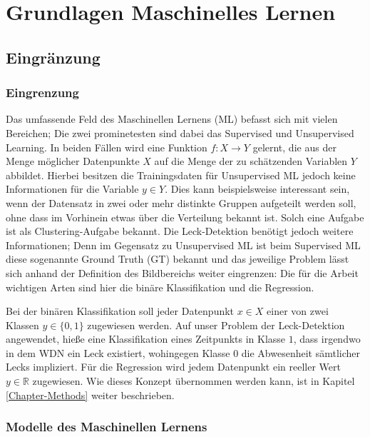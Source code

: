 \chapter{Grundlagen Maschinelles Lernen \label{Chapter-ML}}

\section{Eingränzung}

\subsection*{Eingrenzung}

Das umfassende Feld des Maschinellen Lernens (ML) befasst sich mit vielen Bereichen;
 Die zwei prominetesten sind dabei das Supervised und Unsupervised Learning. In beiden Fällen wird eine Funktion
 $f: X \rightarrow Y$ gelernt, die aus der Menge möglicher Datenpunkte $X$ auf die Menge der zu schätzenden
 Variablen $Y$ abbildet. Hierbei besitzen die Trainingsdaten für Unsupervised ML jedoch keine Informationen für
 die Variable $y \in Y$. Dies kann beispielsweise interessant sein, wenn der Datensatz in zwei oder mehr distinkte
 Gruppen aufgeteilt werden soll, ohne dass im Vorhinein etwas über die Verteilung bekannt ist. Solch eine
 Aufgabe ist als Clustering-Aufgabe bekannt. Die Leck-Detektion benötigt jedoch weitere Informationen;
 Denn im Gegensatz zu Unsupervised ML ist beim Supervised ML diese sogenannte Ground Truth (GT) bekannt und
 das jeweilige Problem lässt sich anhand der Definition des Bildbereichs weiter eingrenzen: Die für die
 Arbeit wichtigen Arten sind hier die binäre Klassifikation und die Regression.

Bei der binären Klassifikation soll jeder Datenpunkt $x \in X$ einer von zwei Klassen $y \in \{0, 1\}$ zugewiesen
 werden. Auf unser Problem der Leck-Detektion angewendet, hieße eine Klassifikation eines Zeitpunkts in
 Klasse $1$, dass irgendwo in dem WDN ein Leck existiert, wohingegen Klasse $0$ die Abwesenheit sämtlicher
 Lecks impliziert. Für die Regression wird jedem Datenpunkt ein reeller Wert $y \in \mathbb{R}$ zugewiesen.
 Wie dieses Konzept übernommen werden kann, ist in Kapitel \ref{Chapter-Methods} weiter beschrieben. 


\subsection*{Modelle des Maschinellen Lernens}


